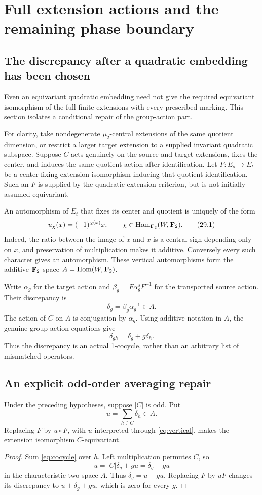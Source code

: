 \section{Full extension actions and the remaining phase boundary}\label{sec:actions}
\subsection{The discrepancy after a quadratic embedding has been chosen}
Even an equivariant quadratic embedding need not give the required equivariant isomorphism of the full finite extensions with every prescribed marking. This section isolates a conditional repair of the group-action part.

For clarity, take nondegenerate $\mu_2$-central extensions of the same quotient dimension, or restrict a larger target extension to a supplied invariant quadratic subspace. Suppose $C$ acts genuinely on the source and target extensions, fixes the center, and induces the same quotient action after identification. Let $F:E_s\to E_t$ be a center-fixing extension isomorphism inducing that quotient identification. Such an $F$ is supplied by the quadratic extension criterion, but is not initially assumed equivariant.

An automorphism of $E_t$ that fixes its center and quotient is uniquely of the form
\[
 u_\chi(x)=(-1)^{\chi(\bar x)}x,
 \qquad \chi\in\operatorname{Hom}_{\mathbf F_2}(W,\mathbf F_2).
 \tag{29.1}\label{eq:vertical}
\]
Indeed, the ratio between the image of $x$ and $x$ is a central sign depending only on $\bar x$, and preservation of multiplication makes it additive. Conversely every such character gives an automorphism. These vertical automorphisms form the additive $\mathbf F_2$-space $A=\operatorname{Hom}(W,\mathbf F_2)$.

Write $\alpha_g$ for the target action and $\beta_g=F\alpha^s_gF^{-1}$ for the transported source action. Their discrepancy is
\[
 \delta_g=\beta_g\alpha_g^{-1}\in A.
\]
The action of $C$ on $A$ is conjugation by $\alpha_g$. Using additive notation in $A$, the genuine group-action equations give
\[
 \delta_{gh}=\delta_g+g\delta_h.
 \tag{29.2}\label{eq:cocycle}
\]
Thus the discrepancy is an actual 1-cocycle, rather than an arbitrary list of mismatched operators.

\subsection{An explicit odd-order averaging repair}
\begin{proposition}\label{prop:odd-action}
Under the preceding hypotheses, suppose $|C|$ is odd. Put
\[
 u=\sum_{h\in C}\delta_h\in A.
 \tag{29.3}\label{eq:average}
\]
Replacing $F$ by $u\circ F$, with $u$ interpreted through \eqref{eq:vertical}, makes the extension isomorphism $C$-equivariant.
\end{proposition}
\begin{proof}
Sum \eqref{eq:cocycle} over $h$. Left multiplication permutes $C$, so
\[
 u=|C|\delta_g+gu=\delta_g+gu
\]
in the characteristic-two space $A$. Thus $\delta_g=u+gu$. Replacing $F$ by $uF$ changes its discrepancy to $u+\delta_g+gu$, which is zero for every $g$.
\end{proof}

